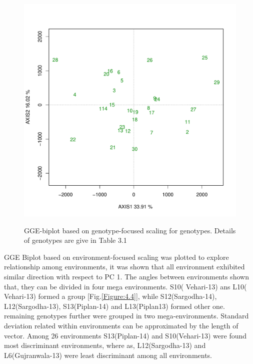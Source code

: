 \begin{figure} [h!]
	\centering  
	\scalebox{0.3}
	{\includegraphics[width=410mm]{02ThesisMain/Ch04RD/figures/gfscale}}
	\caption[GGE-biplot based on genotype-focused scaling for genotypes]{GGE-biplot based on genotype-focused scaling for genotypes. Details of genotypes are give in Table 3.1 }
\label{Figure:4.3}
\end{figure}



GGE Biplot  based on environment-focused scaling was plotted to explore relationship among environments, it was shown that all environment exhibited similar direction with respect to PC 1. The angles between  environments shown that, they can be divided in four mega environments. S10( Vehari-13) ans L10( Vehari-13) formed a group [Fig.\ref{Figure:4.4}], while S12(Sargodha-14), L12(Sargodha-13), S13(Piplan-14) and L13(Piplan13) formed other one. remaining genotypes further were grouped in two mega-environments. Standard deviation related within environments can be approximated by the length of vector. Among 26 environments S13(Piplan-14) and S10(Vehari-13) were found most discriminant environments, where as, L12(Sargodha-13) and L6(Gujranwala-13) were least discriminant among all environments. 

